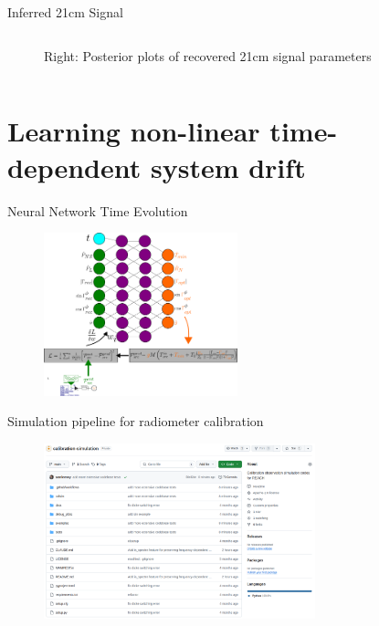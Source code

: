 \documentclass[aspectratio=169]{beamer}
\begin{document}
\begin{frame}{\small{Inferred 21cm Signal}}
\begin{columns}
\begin{column}{0.48\textwidth}
\begin{figure}
				\caption{\tiny Right: Posterior plots of recovered 21cm signal parameters}
			\end{figure}
		\end{column}
	\end{columns}
\end{frame}

\section{Learning non-linear time-dependent system drift}

\begin{frame}{\small{Neural Network Time Evolution}}
	\begin{figure}
		\centering
		\includegraphics[width=0.5\textwidth]{images/nn_time.pdf}
	\end{figure}
\end{frame}

\begin{frame}{\small{Simulation pipeline for radiometer calibration}}
	\begin{figure}
		\centering
		\includegraphics[width=0.7\textwidth]{images/githubrepo.png}
	\end{figure}
\end{frame}
\end{document}
